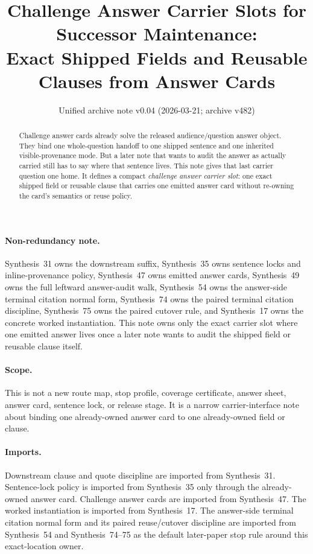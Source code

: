 \documentclass[11pt]{article}
\title{Challenge Answer Carrier Slots for Successor Maintenance:\\[0.5ex]
\large Exact Shipped Fields and Reusable Clauses from Answer Cards}
\author{}
\date{Unified archive note v0.04 (2026-03-21; archive v482)}
\begin{document}
\maketitle

\begin{abstract}
Challenge answer cards already solve the released audience/question answer object.
They bind one whole-question handoff to one shipped sentence and one inherited visible-provenance mode.
But a later note that wants to audit the answer as actually carried still has to say where that sentence lives.
This note gives that last carrier question one home.
It defines a compact \emph{challenge answer carrier slot}: one exact shipped field or reusable clause that carries one emitted answer card without re-owning the card's semantics or reuse policy.
\end{abstract}

\paragraph{Non-redundancy note.}
Synthesis~31 owns the downstream suffix, Synthesis~35 owns sentence locks and inline-provenance policy, Synthesis~47 owns emitted answer cards, Synthesis~49 owns the full leftward answer-audit walk, Synthesis~54 owns the answer-side terminal citation normal form, Synthesis~74 owns the paired terminal citation discipline, Synthesis~75 owns the paired cutover rule, and Synthesis~17 owns the concrete worked instantiation.
This note owns only the exact carrier slot where one emitted answer lives once a later note wants to audit the shipped field or reusable clause itself.

\paragraph{Scope.}
This is not a new route map, stop profile, coverage certificate, answer sheet, answer card, sentence lock, or release stage.
It is a narrow carrier-interface note about binding one already-owned answer card to one already-owned field or clause.

\paragraph{Imports.}
Downstream clause and quote discipline are imported from Synthesis~31.\cite{series:downstreamnormalforms}
Sentence-lock policy is imported from Synthesis~35 only through the already-owned answer card.\cite{series:sentencelocks}
Challenge answer cards are imported from Synthesis~47.\cite{series:challengeanswercards}
The worked instantiation is imported from Synthesis~17.\cite{series:workedexample}
The answer-side terminal citation normal form and its paired reuse/cutover discipline are imported from Synthesis~54 and Synthesis~74--75 as the default later-paper stop rule around this exact-location owner.\cite{series:challengeanswerreviewmenus,series:pairedterminalcitationdiscipline,series:pairedterminalcutoverrules}
\end{document}

